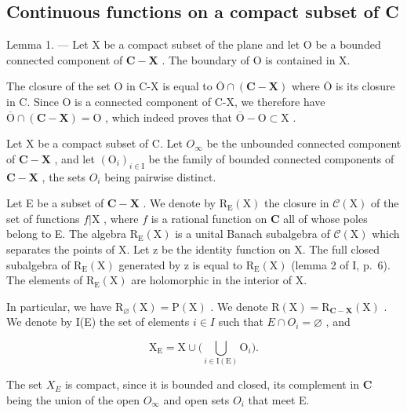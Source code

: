 \subsection{Continuous functions on a compact subset of C}

Lemma 1. --- Let X be a compact subset of the plane and let O be a bounded connected component of \(\mathbf{C} - \mathbf{X}\) . The boundary of O is contained in X.

The closure of the set O in C-X is equal to \(\overline{\mathrm{O}}\cap (\mathbf{C} - \mathbf{X})\) where \(\overline{\mathrm{O}}\) is its closure in C. Since O is a connected component of C-X, we therefore have \(\overline{\mathrm{O}}\cap (\mathbf{C} - \mathbf{X}) = \mathrm{O}\) , which indeed proves that \(\overline{\mathrm{O}} -\mathrm{O}\subset \mathrm{X}\) .

Let X be a compact subset of C. Let \(O_{\infty}\) be the unbounded connected component of \(\mathbf{C} - \mathbf{X}\) , and let \((\mathrm{O}_{i})_{i\in\mathrm{I}}\) be the family of bounded connected components of \(\mathbf{C} - \mathbf{X}\) , the sets \(O_{i}\) being pairwise distinct.

Let E be a subset of \(\mathbf{C} - \mathbf{X}\) . We denote by \(\mathrm{R}_{\mathrm{E}}(\mathrm{X})\) the closure in \(\mathcal{C}(\mathrm{X})\) of the set of functions \(f|\mathrm{X}\) , where \(f\) is a rational function on \(\mathbf{C}\) all of whose poles belong to E. The algebra \(\mathrm{R}_{\mathrm{E}}(\mathrm{X})\) is a unital Banach subalgebra of \(\mathcal{C}(\mathrm{X})\) which separates the points of X. Let z be the identity function on X. The full closed subalgebra of \(\mathrm{R}_{\mathrm{E}}(\mathrm{X})\) generated by z is equal to \(\mathrm{R}_{\mathrm{E}}(\mathrm{X})\) (lemma 2 of I, p.~6). The elements of \(\mathrm{R}_{\mathrm{E}}(\mathrm{X})\) are holomorphic in the interior of X.

In particular, we have \(\mathrm{R}_{\varnothing}(\mathrm{X})=\mathrm{P}(\mathrm{X})\) . We denote \(\mathrm{R}(\mathrm{X})=\mathrm{R}_{\mathbf{C}-\mathbf{X}}(\mathrm{X})\) . We denote by I(E) the set of elements \(i\in I\) such that \(E\cap O_{i}=\varnothing\) , and

\[
\mathrm{X} _ {\mathrm{E}} = \mathrm{X} \cup \Big (\bigcup_ {i \in \mathrm{I} (\mathrm{E})} \mathrm{O} _ {i} \Big).
\]

The set \(X_{E}\) is compact, since it is bounded and closed, its complement in \(\mathbf{C}\) being the union of the open \(O_{\infty}\) and open sets \(O_{i}\) that meet E.

